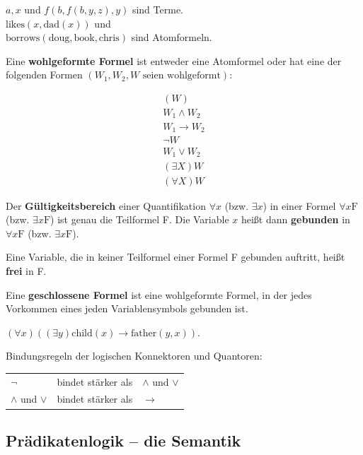 \documentclass[runningheads,deutsch]{llncs}
\begin{document}
\begin{example}
    $a, x$ und $f(b, f(b, y, z), y)$ sind Terme.\\
    $\text{likes}(x, \text{dad}(x))$ und \\
    $\text{borrows}(\text{doug}, \text{book}, \text{chris})$ sind Atomformeln.
\end{example}

Eine \textbf{wohlgeformte Formel} ist entweder eine Atomformel oder hat eine der folgenden Formen $(W_1, W_2, W \text{ seien wohlgeformt}):$

\begin{align}
    (W) \\
    W_1 \land W_2 \\
    W_1 \rightarrow W_2 \\
    \lnot W \\
    W_1 \lor W_2 \\
    (\exists X) W \\
    (\forall X) W
\end{align}

Der \textbf{Gültigkeitsbereich} einer Quantifikation $\forall x$ (bzw. $\exists x$) in einer Formel $\forall x \text{F}$ (bzw. $\exists x \text{F}$) ist genau die Teilformel F. Die Variable $x$ heißt dann \textbf{gebunden} in $\forall x \text{F}$ (bzw. $\exists x \text{F}$).

Eine Variable, die in keiner Teilformel einer Formel F gebunden auftritt, heißt \textbf{frei} in F.

Eine \textbf{geschlossene Formel} ist eine wohlgeformte Formel, in der jedes Vorkommen eines jeden Variablensymbols gebunden ist.

\begin{example}
    $(\forall x)((\exists y) \text{child}(x) \rightarrow \text{father}(y, x)).$
\end{example}

Bindungsregeln der logischen Konnektoren und Quantoren:

\setlength{\tabcolsep}{12pt}
\begin{center}    
    \begin{tabular}{l l l}
        $\lnot$           & bindet stärker als & $\land$ und $\lor$ \\
        $\land$ und $\lor$ & bindet stärker als & $\rightarrow$
    \end{tabular}
\end{center}

\subsection{Prädikatenlogik -- die Semantik}
\end{document}
